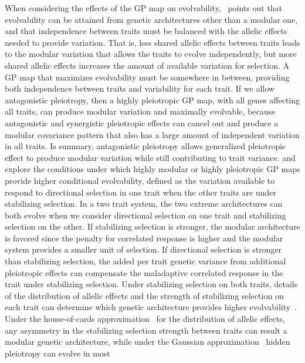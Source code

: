 \begin{refsection}
When considering the effects of the GP map on
evolvability,~\textcite{Hansen2003-fh} points out that evolvability can be
attained from genetic architectures other than a modular one, and that
independence between traits must be balanced with the allelic effects needed
to provide variation. That is, less shared allelic effects between traits
leads to the modular variation that allows the traits to evolve independently,
but more shared allelic effects increases the amount of available variation
for selection. A GP map that maximizes evolvability must be somewhere in
between, providing both independence between traits and variability for each
trait. If we allow antagonistic pleiotropy, then a highly pleiotropic GP map,
with all genes affecting all traits, can produce modular variation and
maximally evolvable, because antagonistic and synergistic pleiotropic effects
can cancel out and produce a modular covariance pattern that also has a large
amount of independent variation in all traits. Is summary, antagonistic
pleiotropy allows generalized pleiotropic effect to produce modular variation
while still contributing to trait variance. \textcite{Hansen2003-fh}
and~\textcite{Pavlicev2011-xm} explore the conditions under which highly
modular or highly pleiotropic GP maps provide higher conditional evolvability,
defined as the variation available to respond to directional selection in one
trait when the other traits are under stabilizing selection. In a two trait
system, the two extreme architectures can both evolve when we consider
directional selection on one trait and stabilizing selection on the other. If
stabilizing selection is stronger, the modular architecture is favored since
the penalty for correlated response is higher and the modular system provides
a smaller unit of selection. If directional selection is stronger than
stabilizing selection, the added per trait genetic variance from additional
pleiotropic effects can compensate the maladaptive correlated response in the
trait under stabilizing selection. Under stabilizing selection on both traits,
details of the distribution of allelic effects and the strength of stabilizing
selection on each trait can determine which genetic architecture provides
higher evolvability~\parencite{Pavlicev2011-xm}. Under the house-of-cards
approximation~\parencite{Turelli1984-cp} for the distribution of allelic
effects, any asymmetry in the stabilizing selection strength between traits
can result a modular genetic architecture, while under the Gaussian
approximation~\parencite{Lande1980-kn} hidden pleiotropy can evolve in most

\end{refsection}
